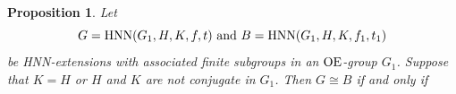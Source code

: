 \documentclass[a4paper,12pt]{article}
\newtheorem{cor}[thm]{Corollary}
\newtheorem{prop}[thm]{Proposition}
\def\OE{{\rm OE}}
\def\hnn {{\rm HNN}}
\begin{document}
{%











\begin{prop}\label{nonnormalhnnabs} 
Let  $$G= \hnn(G_1, H, K, f, t)\  {\rm and}\  B=\hnn(G_1, H, K, f_1, t_1)$$ be HNN-extensions  with  associated finite subgroups in an $\OE$-group $G_1$. Suppose that $K=H$ or $H$ and $K$ are not conjugate in $G_1$. Then $G\cong B$ if and only if \begin{enumerate}



\end{enumerate}
\end{prop}}
\end{document}
